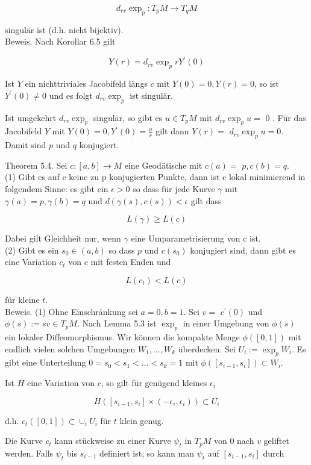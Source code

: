 \documentclass[10pt, letterpaper]{article}
\begin{document}
$$
d_{r v} \exp _{p}: T_{p} M \rightarrow T_{q} M
$$

singulär ist (d.h. nicht bijektiv).\\
Beweis. Nach Korollar 6.5 gilt

$$
Y(r)=d_{r v} \exp _{p} r Y^{\prime}(0)
$$

Ist $Y$ ein nichttriviales Jacobifeld längs $c$ mit $Y(0)=0, Y(r)=0$, so ist $Y^{\prime}(0) \neq 0$ und es folgt $d_{r v} \exp _{p}$ ist singulär.

Ist umgekehrt $d_{r v} \exp _{p}$ singulär, so gibt es $u \in T_{p} M$ mit $d_{r v} \exp _{p} u=$ 0 . Für das Jacobifeld $Y$ mit $Y(0)=0, Y^{\prime}(0)=\frac{u}{r}$ gilt dann $Y(r)=$ $d_{r v} \exp _{p} u=0$. Damit sind $p$ und $q$ konjugiert.

Theorem 5.4. Sei $c:[a, b] \rightarrow M$ eine Geodätische mit $c(a)=$ $p, c(b)=q$.\\
(1) Gibt es auf c keine zu p konjugierten Punkte, dann ist c lokal minimierend in folgendem Sinne: es gibt ein $\epsilon>0$ so dass für jede Kurve $\gamma$ mit $\gamma(a)=p, \gamma(b)=q$ und $d(\gamma(s), c(s))<\epsilon$ gilt dass

$$
L(\gamma) \geq L(c)
$$

Dabei gilt Gleichheit nur, wenn $\gamma$ eine Umparametrisierung von c ist.\\
(2) Gibt es ein $s_{0} \in(a, b)$ so dass $p$ und $c\left(s_{0}\right)$ konjugiert sind, dann gibt es eine Variation $c_{t}$ von $c$ mit festen Enden und

$$
L\left(c_{t}\right)<L(c)
$$

für kleine $t$.\\
Beweis. (1) Ohne Einschränkung sei $a=0, b=1$. Sei $v=$ $c^{\prime}(0)$ und $\phi(s):=s v \in T_{p} M$. Nach Lemma 5.3 ist $\exp _{p}$ in einer Umgebung von $\phi(s)$ ein lokaler Diffeomorphismus. Wir können die kompakte Menge $\phi([0,1])$ mit endlich vielen solchen Umgebungen $W_{1}, \ldots, W_{k}$ überdecken. Sei $U_{i}:=\exp _{p} W_{i}$. Es gibt eine Unterteilung $0=s_{0}<s_{1}<\ldots<s_{k}=1$ mit $\phi\left(\left[s_{i-1}, s_{i}\right]\right) \subset W_{i}$.

Ist $H$ eine Variation von $c$, so gilt für genügend kleines $\epsilon_{i}$

$$
H\left(\left[s_{i-1}, s_{i}\right] \times\left(-\epsilon_{i}, \epsilon_{i}\right)\right) \subset U_{i}
$$

d.h. $c_{t}([0,1]) \subset \cup_{i} U_{i}$ für $t$ klein genug.

Die Kurve $c_{t}$ kann stückweise zu einer Kurve $\psi_{t}$ in $T_{p} M$ von 0 nach $v$ geliftet werden. Falls $\psi_{t}$ bis $s_{i-1}$ definiert ist, so kann man $\psi_{t}$ auf $\left[s_{i-1}, s_{i}\right]$ durch
\end{document}
